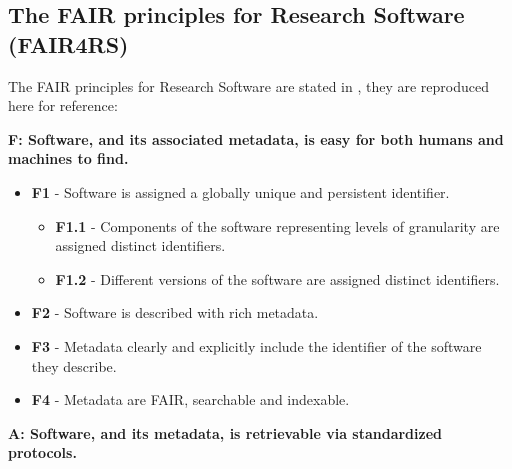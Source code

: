 
\subsection{The FAIR principles for Research Software (FAIR4RS)}


The FAIR principles for Research Software are stated in \cite{chue_hong_neil_p_2022_6623556}, they
are reproduced here for reference:

\textbf{F: Software, and its associated metadata, is easy for both humans and machines to find.}

\begin{itemize}
    \item \textbf{F1} - Software is assigned a globally unique and persistent identifier.
    \begin{itemize}
        \item \textbf{F1.1} - Components of the software representing levels of granularity are assigned distinct identifiers.
        \item \textbf{F1.2} - Different versions of the software are assigned distinct identifiers.
    \end{itemize}

    \item \textbf{F2} - Software is described with rich metadata.
    \item \textbf{F3} - Metadata clearly and explicitly include the identifier of the software they describe.
    \item \textbf{F4} - Metadata are FAIR, searchable and indexable.
\end{itemize}

\textbf{A: Software, and its metadata, is retrievable via standardized protocols.}

